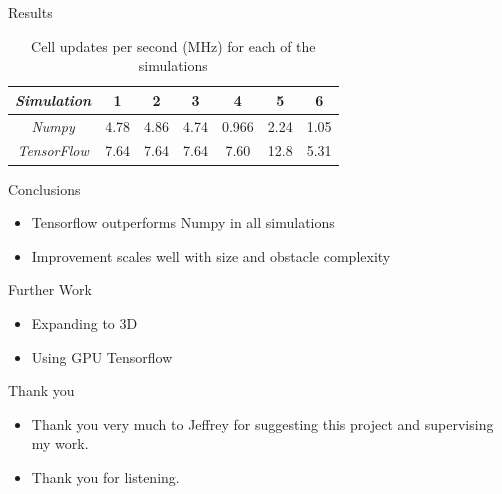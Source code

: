 \documentclass{beamer}
\begin{document}
\begin{frame}{Results}

\begin{table}[H]
\caption{Cell updates per second (MHz) for each of the simulations}
\begin{center}
\begin{tabular}{c||c|c|c|c|c|c}
\emph{Simulation} & 1 & 2 & 3 & 4 & 5 & 6\\
\hline
\hline
\emph{Numpy} & 4.78 & 4.86 & 4.74 & 0.966 & 2.24 & 1.05 \\
\hline
\emph{TensorFlow} & 7.64 & 7.64 & 7.64 & 7.60 & 12.8 & 5.31 \\
\hline
\end{tabular}
\end{center}
\end{table}

\end{frame}

\begin{frame}{Conclusions}

\begin{itemize}
    \item Tensorflow outperforms Numpy in all simulations
    \item Improvement scales well with size and obstacle complexity
\end{itemize}

\end{frame}

\begin{frame}{Further Work}

\begin{itemize}
    \item Expanding to 3D
    \item Using GPU Tensorflow
\end{itemize}

\end{frame}


\begin{frame}{Thank you}

\begin{itemize}
    \item Thank you very much to Jeffrey for suggesting this project and supervising my work.
    \item Thank you for listening.
\end{itemize}

\end{frame}
\end{document}
